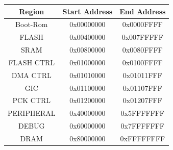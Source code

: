 \begin{center}
    \begin{tabular}{||c | c | c ||}
        \hline
        Region & Start Address & End Address \\ 
        \hline\hline
        Boot-Rom & 0x00000000 & 0x0000FFFF \\
        \hline
        FLASH & 0x00400000 & 0x007FFFFF \\
        \hline
        SRAM & 0x00800000 & 0x0080FFFF \\
        \hline
        FLASH CTRL & 0x01000000 & 0x0100FFFF \\
        \hline
        DMA CTRL & 0x01010000 & 0x01011FFF \\
        \hline
        GIC & 0x01100000 & 0x01107FFF \\
        \hline
        PCK CTRL & 0x01200000 & 0x01207FFF \\
        \hline
        PERIPHERAL & 0x40000000 & 0x5FFFFFFF \\
        \hline
        DEBUG & 0x60000000 & 0x7FFFFFFF \\
        \hline
        DRAM & 0x80000000 & 0xFFFFFFFF \\
        \hline
    \end{tabular}
\end{center}
